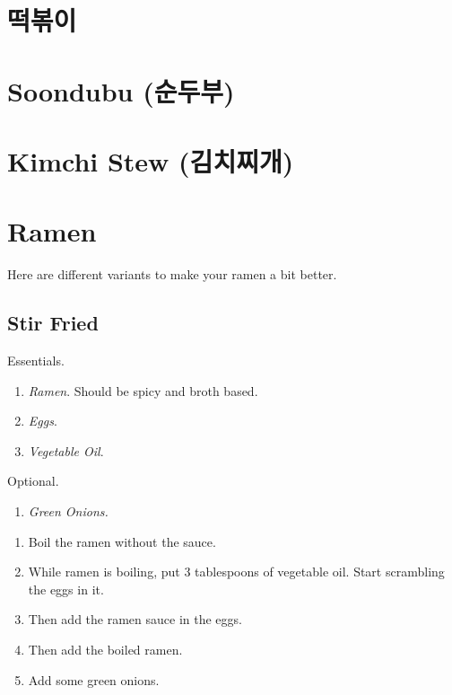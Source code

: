 \documentclass{article}
\begin{document}
\section{떡볶이} 

\section{Soondubu (순두부)}

\section{Kimchi Stew (김치찌개)}

\section{Ramen} 

  Here are different variants to make your ramen a bit better. 

  \subsection{Stir Fried} 

    \begin{definition}
      Essentials. 
      \begin{enumerate}
        \item \textit{Ramen}. Should be spicy and broth based. 
        \item \textit{Eggs}. 
        \item \textit{Vegetable Oil}. 
      \end{enumerate}
      Optional. 
      \begin{enumerate}
        \item \textit{Green Onions. }
      \end{enumerate}
    \end{definition}

    \begin{theorem}
      \begin{enumerate}
        \item Boil the ramen without the sauce. 
        \item While ramen is boiling, put 3 tablespoons of vegetable oil. Start scrambling the eggs in it. 
        \item Then add the ramen sauce in the eggs. 
        \item Then add the boiled ramen. 
        \item Add some green onions. 
      \end{enumerate}
    \end{theorem}
\end{document}
